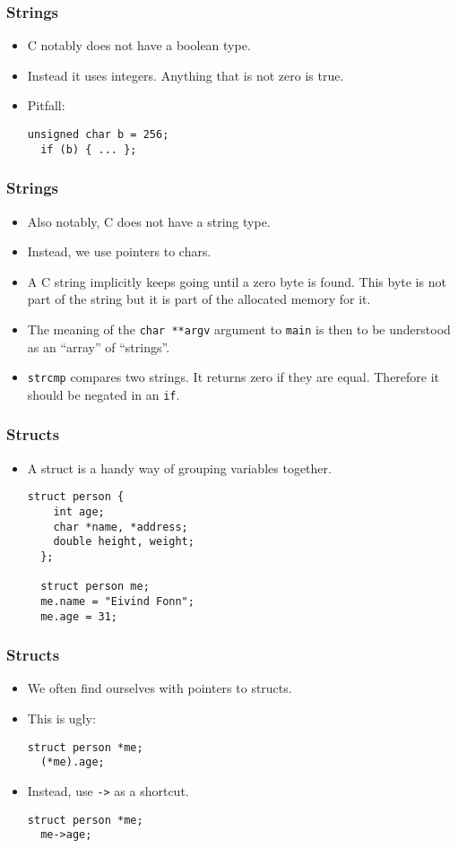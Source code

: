\begin{frame}[fragile]
  \frametitle{Strings}
  \begin{itemize}
  \item C notably does not have a boolean type.
  \item Instead it uses integers. Anything that is not zero is true.
  \item Pitfall:
    \begin{lstlisting}[style=c]
  unsigned char b = 256;
  if (b) { ... };
    \end{lstlisting}
  \end{itemize}
\end{frame}

\begin{frame}[fragile]
  \frametitle{Strings}
  \begin{itemize}
  \item Also notably, C does not have a string type.
  \item Instead, we use pointers to chars.
  \item A C string implicitly keeps going until a zero byte is found. This byte
    is not part of the string but it is part of the allocated memory for it.
  \item The meaning of the \texttt{char **argv} argument to \texttt{main} is
    then to be understood as an ``array'' of ``strings''.
  \item \texttt{strcmp} compares two strings. It returns zero if they are equal.
    Therefore it should be negated in an \texttt{if}.
  \end{itemize}
\end{frame}

\begin{frame}[fragile]
  \frametitle{Structs}
  \begin{itemize}
  \item A struct is a handy way of grouping variables together.
    \begin{lstlisting}[style=c]
  struct person {
    int age;
    char *name, *address;
    double height, weight;
  };

  struct person me;
  me.name = "Eivind Fonn";
  me.age = 31;
    \end{lstlisting}
  \end{itemize}
\end{frame}

\begin{frame}[fragile]
  \frametitle{Structs}
  \begin{itemize}
  \item We often find ourselves with pointers to structs.
  \item This is ugly:
    \begin{lstlisting}[style=c]
  struct person *me;
  (*me).age;
    \end{lstlisting}
  \item Instead, use \texttt{->} as a shortcut.
    \begin{lstlisting}[style=c]
  struct person *me;
  me->age;
    \end{lstlisting}
  \end{itemize}
\end{frame}

